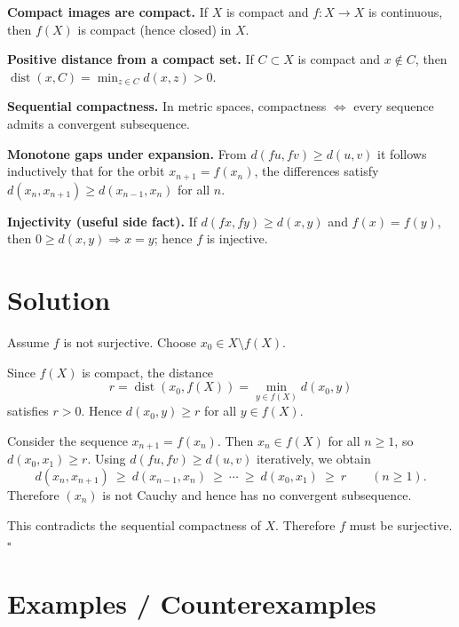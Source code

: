 \documentclass[12pt,a4paper]{article}
\newcommand{\qed}{\hfill$\square$}
\theoremstyle{plain}
\theoremstyle{definition}
\theoremstyle{remark}
\theoremstyle{remark}
\begin{document}
\noindent\textbf{Compact images are compact.}
If \(X\) is compact and \(f:X\to X\) is continuous, then \(f(X)\) is compact (hence closed) in \(X\).

\smallskip

\noindent\textbf{Positive distance from a compact set.}
If \(C\subset X\) is compact and \(x\notin C\), then
\(\operatorname{dist}(x,C)=\min_{z\in C} d(x,z)>0\).

\smallskip

\noindent\textbf{Sequential compactness.}
In metric spaces, compactness \(\Leftrightarrow\) every sequence admits a convergent subsequence.

\smallskip

\noindent\textbf{Monotone gaps under expansion.}
From \(d(fu,fv)\ge d(u,v)\) it follows inductively that for the orbit \(x_{n+1}=f(x_n)\),
the differences satisfy \(d(x_n,x_{n+1})\ge d(x_{n-1},x_n)\) for all \(n\).

\smallskip

\noindent\textbf{Injectivity (useful side fact).}
If \(d(fx,fy)\ge d(x,y)\) and \(f(x)=f(y)\), then \(0\ge d(x,y)\Rightarrow x=y\); hence \(f\) is injective.

\smallskip

\section*{Solution}

Assume \(f\) is not surjective. Choose \(x_0\in X\setminus f(X)\).

Since \(f(X)\) is compact, the distance
\[
r=\operatorname{dist}(x_0,f(X))=\min_{y\in f(X)} d(x_0,y)
\]
satisfies \(r>0\). Hence \(d(x_0,y)\ge r\) for all \(y\in f(X)\).

\smallskip

Consider the sequence \(x_{n+1}=f(x_n)\). Then \(x_n\in f(X)\) for all \(n\ge1\), so
\(d(x_0,x_1)\ge r\).
Using \(d(fu,fv)\ge d(u,v)\) iteratively, we obtain
\[
d(x_n,x_{n+1}) \ \ge\ d(x_{n-1},x_n) \ \ge \ \cdots \ \ge\ d(x_0,x_1)\ \ge\ r
\qquad (n\ge1).
\]
Therefore \((x_n)\) is not Cauchy and hence has no convergent subsequence.

\smallskip

This contradicts the sequential compactness of \(X\). Therefore \(f\) must be surjective. \qed

\smallskip

\section*{Examples / Counterexamples}
\end{document}
